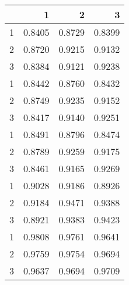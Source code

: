 \begin{tabular}{lrrr}
\toprule
{} &       1 &       2 &       3 \\
\midrule
1 &  0.8405 &  0.8729 &  0.8399 \\
2 &  0.8720 &  0.9215 &  0.9132 \\
3 &  0.8384 &  0.9121 &  0.9238 \\
1 &  0.8442 &  0.8760 &  0.8432 \\
2 &  0.8749 &  0.9235 &  0.9152 \\
3 &  0.8417 &  0.9140 &  0.9251 \\
1 &  0.8491 &  0.8796 &  0.8474 \\
2 &  0.8789 &  0.9259 &  0.9175 \\
3 &  0.8461 &  0.9165 &  0.9269 \\
1 &  0.9028 &  0.9186 &  0.8926 \\
2 &  0.9184 &  0.9471 &  0.9388 \\
3 &  0.8921 &  0.9383 &  0.9423 \\
1 &  0.9808 &  0.9761 &  0.9641 \\
2 &  0.9759 &  0.9754 &  0.9694 \\
3 &  0.9637 &  0.9694 &  0.9709 \\
\bottomrule
\end{tabular}
